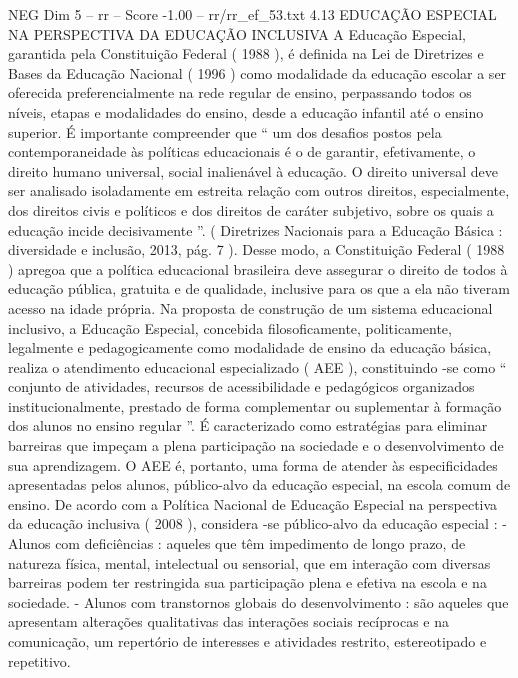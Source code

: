 \begin{textsample}{NEG Dim 5 – rr – Score -1.00 – rr/rr\_ef\_53.txt}  \label{ex:f5_neg_063}
4.13 EDUCAÇÃO ESPECIAL NA PERSPECTIVA DA EDUCAÇÃO INCLUSIVA A Educação Especial, garantida pela Constituição Federal ( 1988 ), é definida na Lei de Diretrizes e Bases da Educação Nacional ( 1996 ) como modalidade da educação escolar a ser oferecida preferencialmente na rede regular de ensino, perpassando todos os níveis, etapas e modalidades do ensino, desde a educação infantil até o ensino superior.
É importante compreender que “ um dos desafios postos pela contemporaneidade às políticas educacionais é o de garantir, efetivamente, o direito humano universal, social inalienável à educação.
O direito universal deve ser analisado isoladamente em estreita relação com outros direitos, especialmente, dos direitos civis e políticos e dos direitos de caráter subjetivo, sobre os quais a educação incide decisivamente ”. ( Diretrizes Nacionais para a Educação Básica : diversidade e inclusão, 2013, pág. 7 ).
Desse modo, a Constituição Federal ( 1988 ) apregoa que a política educacional brasileira deve assegurar o direito de todos à educação pública, gratuita e de qualidade, inclusive para os que a ela não tiveram acesso na idade própria.
Na proposta de construção de um sistema educacional inclusivo, a Educação Especial, concebida filosoficamente, politicamente, legalmente e pedagogicamente como modalidade de ensino da educação básica, realiza o atendimento educacional especializado ( AEE ), constituindo -se como “ conjunto de atividades, recursos de acessibilidade e pedagógicos organizados institucionalmente, prestado de forma complementar ou suplementar à formação dos alunos no ensino regular ”.
É caracterizado como estratégias para eliminar barreiras que impeçam a plena participação na sociedade e o desenvolvimento de sua aprendizagem.
O AEE é, portanto, uma forma de atender às especificidades apresentadas pelos alunos, público-alvo da educação especial, na escola comum de ensino.
De acordo com a Política Nacional de Educação Especial na perspectiva da educação inclusiva ( 2008 ), considera -se público-alvo da educação especial : - Alunos com deficiências : aqueles que têm impedimento de longo prazo, de natureza física, mental, intelectual ou sensorial, que em interação com diversas barreiras podem ter restringida sua participação plena e efetiva na escola e na sociedade. - Alunos com transtornos globais do desenvolvimento : são aqueles que apresentam alterações qualitativas das interações sociais recíprocas e na comunicação, um repertório de interesses e atividades restrito, estereotipado e repetitivo.

\end{textsample}
